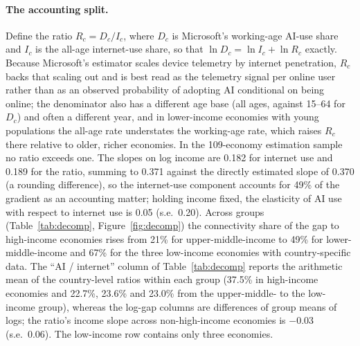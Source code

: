\documentclass[11pt]{article}
\theoremstyle{definition}
\theoremstyle{remark}
\begin{document}
\paragraph{The accounting split.} Define the ratio $R_c=D_c/I_c$, where $D_c$ is Microsoft's working-age AI-use share and $I_c$ is the all-age internet-use share, so that $\ln D_c=\ln I_c+\ln R_c$ exactly. Because Microsoft's estimator scales device telemetry by internet penetration, $R_c$ backs that scaling out and is best read as the telemetry signal per online user rather than as an observed probability of adopting AI conditional on being online; the denominator also has a different age base (all ages, against 15--64 for $D_c$) and often a different year, and in lower-income economies with young populations the all-age rate understates the working-age rate, which raises $R_c$ there relative to older, richer economies. In the 109-economy estimation sample no ratio exceeds one. The slopes on log income are 0.182 for internet use and 0.189 for the ratio, summing to 0.371 against the directly estimated slope of 0.370 (a rounding difference), so the internet-use component accounts for 49\% of the gradient as an accounting matter; holding income fixed, the elasticity of AI use with respect to internet use is 0.05 (s.e.\ 0.20). Across groups (Table~\ref{tab:decomp}, Figure~\ref{fig:decomp}) the connectivity share of the gap to high-income economies rises from 21\% for upper-middle-income to 49\% for lower-middle-income and 67\% for the three low-income economies with country-specific data. The ``AI / internet'' column of Table~\ref{tab:decomp} reports the arithmetic mean of the country-level ratios within each group (37.5\% in high-income economies and 22.7\%, 23.6\% and 23.0\% from the upper-middle- to the low-income group), whereas the log-gap columns are differences of group means of logs; the ratio's income slope across non-high-income economies is $-0.03$ (s.e.\ 0.06). The low-income row contains only three economies.
\end{document}
